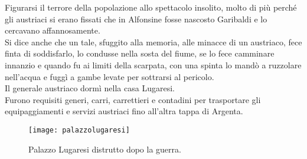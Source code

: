 \indent Figurarsi il terrore della popolazione allo spettacolo insolito, molto di più perché gli austriaci si erano fissati che in Alfonsine fosse nascosto Garibaldi e lo cercavano affannosamente. \\
\indent Si dice anche che un tale, sfuggito alla memoria, alle minacce di un austriaco, fece finta di soddisfarlo, lo condusse nella sosta del fiume, se lo fece camminare innanzio e quando fu ai limiti della scarpata, con una spinta lo mandò a ruzzolare nell'acqua e fuggì a gambe levate per sottrarsi al pericolo.\\
\indent Il generale austriaco dormì nella casa Lugaresi.\\
\indent Furono requisiti generi, carri, carrettieri e contadini per trasportare gli equipaggiamenti e servizi austriaci fino all'altra tappa di Argenta.

 \begin{figure}[htb]
    \centering
    \texttt{[image: palazzolugaresi]}
    \caption*{Palazzo Lugaresi distrutto dopo la guerra.\label{fig:palazzolugaresi}}
\end{figure}
